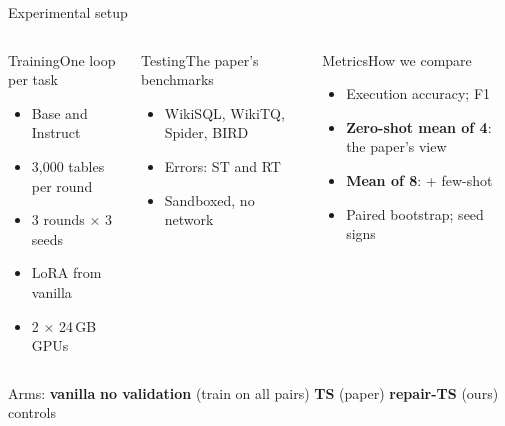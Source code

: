 \documentclass[11pt,aspectratio=169]{beamer}
\begin{document}
\begin{frame}{Experimental setup}
\vspace{0.1cm}
\begin{columns}[T]
\begin{tscard}[tsnavy]{Training}{One loop per task}
\begin{itemize}\footnotesize\setlength{\itemsep}{0pt}
\item Base and Instruct
\item 3,000 tables per round
\item 3 rounds $\times$ 3 seeds
\item LoRA from vanilla
\item 2 $\times$ 24\,GB GPUs
\end{itemize}
\end{tscard}
\begin{tscard}[tsnavy]{Testing}{The paper's benchmarks}
\begin{itemize}\footnotesize\setlength{\itemsep}{0pt}
\item WikiSQL, WikiTQ, Spider, BIRD
\item Errors: ST and RT
\item Sandboxed, no network
\end{itemize}
\end{tscard}
\begin{tscard}[tsred]{Metrics}{How we compare}
\begin{itemize}\footnotesize\setlength{\itemsep}{0pt}
\item Execution accuracy; F1
\item \textbf{Zero-shot mean of 4}: the paper's view
\item \textbf{Mean of 8}: + few-shot
\item Paired bootstrap; seed signs
\end{itemize}
\end{tscard}
\end{columns}
\vspace{0.15cm}
\begin{tscallout}[tspanel]\footnotesize Arms: \textbf{vanilla} \textperiodcentered{} \textbf{no validation} (train on all pairs) \textperiodcentered{} \textbf{TS} (paper) \textperiodcentered{} \textbf{repair-TS} (ours) \textperiodcentered{} controls\end{tscallout}
\end{frame}
\end{document}
